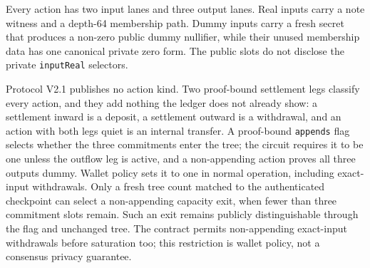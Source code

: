 \documentclass[11pt,letterpaper]{article}
\begin{document}
Every action has two input lanes and three output lanes. Real inputs
carry a note witness and a depth-64 membership path. Dummy inputs carry
a fresh secret that produces a non-zero public dummy nullifier, while
their unused membership data has one canonical private zero form. The
public slots do not disclose the private \texttt{inputReal} selectors.

Protocol V2.1 publishes no action kind. Two proof-bound settlement legs
classify every action, and they add nothing the ledger does not already
show: a settlement inward is a deposit, a settlement outward is a
withdrawal, and an action with both legs quiet is an internal transfer.
A proof-bound \texttt{appends} flag selects whether the three
commitments enter the tree; the circuit requires it to be one unless the
outflow leg is active, and a non-appending action proves all three
outputs dummy. Wallet policy sets it to one in normal operation,
including exact-input withdrawals. Only a fresh tree count matched to
the authenticated checkpoint can select a non-appending capacity exit,
when fewer than three commitment slots remain. Such an exit remains
publicly distinguishable through the flag and unchanged tree. The
contract permits non-appending exact-input withdrawals before saturation
too; this restriction is wallet policy, not a consensus privacy
guarantee.
\end{document}
